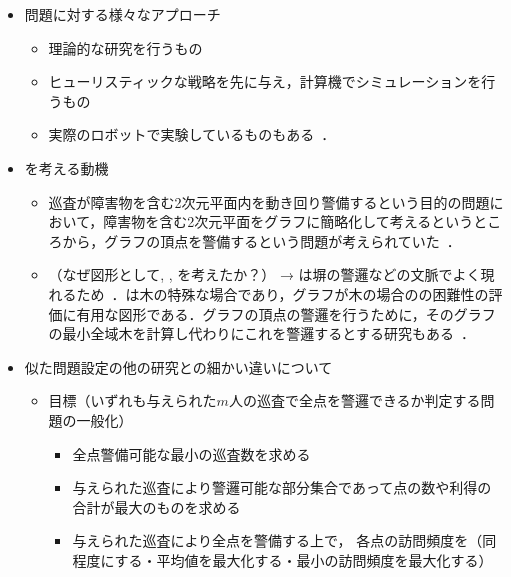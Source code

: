 \begin{itemize}
  \item 問題に対する様々なアプローチ
  \begin{itemize}
    \item 理論的な研究を行うもの~\cite{}
    \item ヒューリスティックな戦略を先に与え，計算機でシミュレーションを行うもの~\cite{}
    \item 実際のロボットで実験しているものもある~\cite{}．
  \end{itemize}

  \item {\patProb}を考える動機
  \begin{itemize}
    \item 巡査が障害物を含む2次元平面内を動き回り警備するという目的の問題において，障害物を含む2次元平面をグラフに簡略化して考えるというところから，グラフの頂点を警備するという問題が考えられていた~\cite{machado2002multi}．
    \item （なぜ図形として{\graphLine}, {\graphStar}, {\graphUnit}を考えたか？）
    → {\graphLine}は塀の警邏などの文脈でよく現れるため~\cite{}．{\graphStar}は木の特殊な場合であり，グラフが木の場合の{\patProb}の困難性の評価に有用な図形である．グラフの頂点の警邏を行うために，そのグラフの最小全域木を計算し代わりにこれを警邏するとする研究もある~\cite{}．
  \end{itemize}

  \item 似た問題設定の他の研究との細かい違いについて
  \begin{itemize}
    \item 目標（いずれも与えられた$m$人の巡査で全点を警邏できるか判定する問題の一般化）
    \begin{itemize}
      \item 全点警備可能な最小の巡査数を求める~\cite{}
      \item 与えられた巡査により警邏可能な部分集合であって点の数や利得の合計が最大のものを求める~\cite{}
      \item 与えられた巡査により全点を警備する上で，
      各点の訪問頻度を（同程度にする・平均値を最大化する・最小の訪問頻度を最大化する）~\cite{}
    \end{itemize}
  \end{itemize}



\end{itemize}
